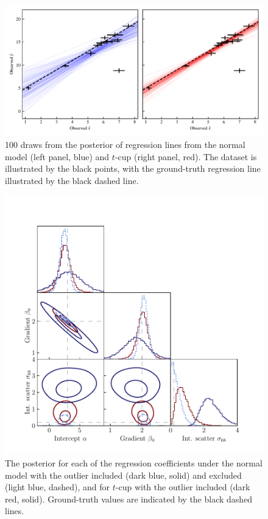 \documentclass[fleqn,usenatbib]{rasti}
\begin{document}
\begin{figure}
    \includegraphics[width=\linewidth]{graphics/fixed/regression_outlier.pdf}
    \caption{100 draws from the posterior of regression lines from
    the normal model (left panel, blue) and $t$-cup (right panel, red). The
    dataset is illustrated by the black points, with the ground-truth regression
    line illustrated by the black dashed line.}
    \label{fig:results.outlier.regression}
\end{figure}

\begin{figure}
    \includegraphics[width=\columnwidth]{graphics/fixed/corner_outlier_ncup.pdf}
    \caption{The posterior for each of the regression coefficients under the
    normal model with the outlier included (dark blue, solid) and excluded
    (light blue, dashed), and for $t$-cup with the outlier included (dark red,
    solid). Ground-truth values are indicated by the black dashed lines.}
    \label{fig:results.outlier.corner}
\end{figure}
\end{document}
